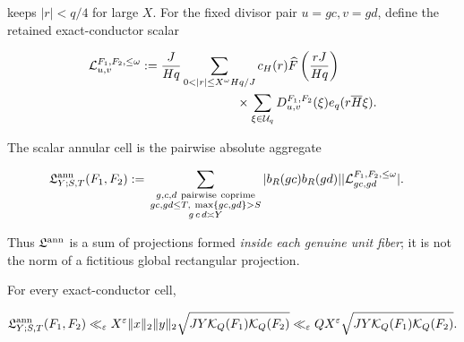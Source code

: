 keeps \(|r|<q/4\) for large \(X\).  For the fixed divisor pair
\(u=gc,v=gd\), define the retained
exact-conductor scalar

\begin{align}
 \cL_{u,v}^{F_1,F_2,\le\omega}
 :={}&\frac{J}{Hq}
 \sum_{0<|r|\le X^\omega Hq/J}
 c_H(r)\widehat F\left(\frac{rJ}{Hq}\right)
 \notag\\
 &\qquad\qquad\qquad\times
 \sum_{\xi\in\cU_q}D_{u,v}^{F_1,F_2}(\xi)
 e_q(r\overline H\xi).
 \label{eq:tpc26-pair-cell-functional}
\end{align}

The scalar annular cell is the pairwise absolute aggregate

\begin{align}
 \mathfrak L^{\rm ann}_{Y;S,T}(F_1,F_2)
 :={}&
 \sum_{\substack{g,c,d\ \mathrm{pairwise\ coprime}\\
                  gc,gd\le T,\ \max\{gc,gd\}>S\\
                  g\,c\,d\asymp Y}}
 |b_R(gc)b_R(gd)|
 |\mathcal L_{gc,gd}^{F_1,F_2,\le\omega}|.
 \label{eq:tpc26-annular-cell-definition}
\end{align}

Thus \(\mathfrak L^{\rm ann}\) is a sum of projections formed
\emph{inside each genuine unit fiber}; it is not the norm of a
fictitious global rectangular projection.

\begin{lemma}
\label{lem:tpc26-norm-route}
For every exact-conductor cell,

\begin{equation}
 \mathfrak L^{\rm ann}_{Y;S,T}(F_1,F_2)
 \ll_\varepsilon X^\varepsilon\|x\|_2\|y\|_2
 \sqrt{JY\mathcal K_Q(F_1)\mathcal K_Q(F_2)}
 \ll_\varepsilon QX^\varepsilon
 \sqrt{JY\mathcal K_Q(F_1)\mathcal K_Q(F_2)}.
 \label{eq:tpc26-norm-route}
\end{equation}
\end{lemma}

